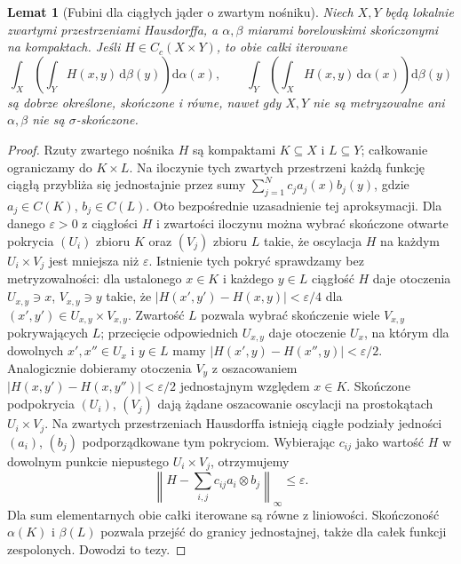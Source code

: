 \documentclass[11pt,a4paper,oneside]{book}
\numberwithin{equation}{chapter}
\theoremstyle{plain}
\newtheorem{lemat}[twierdzenie]{Lemat}
\theoremstyle{definition}
\theoremstyle{remark}
\begin{document}
\begin{lemat}[Fubini dla ciągłych jąder o zwartym nośniku]
\label{lem:haar-fubini-compact-23}
Niech $X,Y$ będą lokalnie zwartymi przestrzeniami Hausdorffa,
a $\alpha,\beta$ miarami borelowskimi skończonymi na
kompaktach. Jeśli $H\in C_c(X\times Y)$, to obie całki iterowane
\[
 \int_X\!\left(\int_Y H(x,y)\,\mathrm d\beta(y)\right)
 \mathrm d\alpha(x),\qquad
 \int_Y\!\left(\int_X H(x,y)\,\mathrm d\alpha(x)\right)
 \mathrm d\beta(y)
\]
są dobrze określone, skończone i równe, nawet gdy
$X,Y$ nie są metryzowalne ani $\alpha,\beta$
nie są $\sigma$-skończone.
\end{lemat}
\begin{proof}
Rzuty zwartego nośnika $H$ są kompaktami $K\subseteq X$
i $L\subseteq Y$; całkowanie ograniczamy do $K\times L$.
Na iloczynie tych zwartych przestrzeni każdą funkcję
ciągłą przybliża się jednostajnie przez sumy
$\sum_{j=1}^Nc_j a_j(x)b_j(y)$, gdzie
$a_j\in C(K)$, $b_j\in C(L)$. Oto bezpośrednie
uzasadnienie tej aproksymacji. Dla danego $\varepsilon>0$
z ciągłości $H$ i zwartości iloczynu można wybrać
skończone otwarte pokrycia $(U_i)$ zbioru $K$ oraz
$(V_j)$ zbioru $L$ takie, że oscylacja $H$ na każdym
$U_i\times V_j$ jest mniejsza niż $\varepsilon$.
Istnienie tych pokryć sprawdzamy bez metryzowalności:
dla ustalonego $x\in K$ i każdego $y\in L$ ciągłość
$H$ daje otoczenia $U_{x,y}\ni x$, $V_{x,y}\ni y$
takie, że $|H(x',y')-H(x,y)|<\varepsilon/4$
dla $(x',y')\in U_{x,y}\times V_{x,y}$.
Zwartość $L$ pozwala wybrać skończenie wiele
$V_{x,y}$ pokrywających $L$; przecięcie
odpowiednich $U_{x,y}$ daje otoczenie $U_x$,
na którym dla dowolnych $x',x''\in U_x$ i $y\in L$
mamy $|H(x',y)-H(x'',y)|<\varepsilon/2$.
Analogicznie dobieramy otoczenia $V_y$ z oszacowaniem
$|H(x,y')-H(x,y'')|<\varepsilon/2$ jednostajnym
względem $x\in K$. Skończone podpokrycia
$(U_i)$, $(V_j)$ dają żądane oszacowanie oscylacji
na prostokątach $U_i\times V_j$.
Na zwartych przestrzeniach
Hausdorffa istnieją ciągłe podziały jedności
$(a_i)$, $(b_j)$ podporządkowane tym pokryciom.
Wybierając $c_{ij}$ jako wartość $H$ w dowolnym
punkcie niepustego $U_i\times V_j$, otrzymujemy
\[
 \left\|H-\sum_{i,j}c_{ij}a_i\otimes b_j\right\|_\infty
 \le\varepsilon.
\]
Dla sum elementarnych obie całki iterowane są równe
z liniowości. Skończoność $\alpha(K)$ i $\beta(L)$
pozwala przejść do granicy jednostajnej, także dla
całek funkcji zespolonych. Dowodzi to tezy.
\end{proof}
\end{document}
